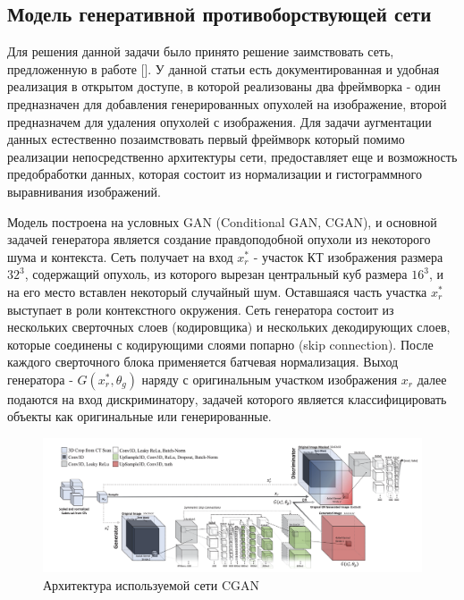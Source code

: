 \subsection{Модель генеративной противоборствующей сети}

Для решения данной задачи было принято решение заимствовать сеть, предложенную в работе []. У данной статьи есть документированная и удобная реализация в открытом доступе, в которой реализованы два фреймворка - один предназначен для добавления генерированных опухолей на изображение, второй предназначем для удаления опухолей с изображения. Для задачи аугментации данных естественно позаимствовать первый фреймворк который помимо реализации непосредственно архитектуры сети, предоставляет еще и возможность предобработки данных, которая состоит из нормализации и гистограммного выравнивания изображений.

Модель построена на условных GAN (Conditional GAN, CGAN), и основной задачей генератора является создание правдоподобной опухоли из некоторого шума и контекста. Сеть получает на вход $x_r^*$ - участок КТ изображения размера $32^3$, содержащий опухоль, из которого вырезан центральный куб размера $16^3$, и на его место вставлен некоторый случайный шум. Оставшаяся часть участка $x_r^*$ выступает в роли контекстного окружения. Сеть генератора состоит из нескольких сверточных слоев (кодировщика) и нескольких декодирующих слоев, которые соединены с кодирующими слоями попарно (skip connection). После каждого сверточного блока применяется батчевая нормализация. Выход генератора - $G(x_r^*, \theta_g)$ наряду с оригинальным участком изображения $x_r$ далее подаются на вход дискриминатору, задачей которого является классифицировать объекты как оригинальные или генерированные.

\begin{figure}[!h]
\includegraphics[width=\linewidth]{mirskiy-cgan-architecture.png}
\caption{Архитектура используемой сети CGAN}\label{mirskiy-cgan-architecture}
\centering
\end{figure}

